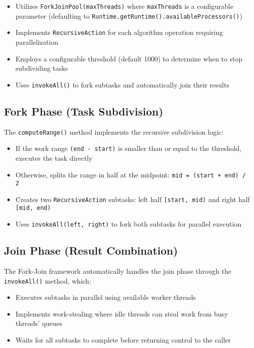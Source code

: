 \begin{itemize}
    \item Utilizes \texttt{ForkJoinPool(maxThreads)} where \texttt{maxThreads}
    is a configurable parameter (defaulting to
    \texttt{Runtime.getRuntime().availableProcessors()})
    \item Implements \texttt{RecursiveAction} for each algorithm operation
    requiring parallelization
    \item Employs a configurable threshold (default 1000) to determine when to
    stop subdividing tasks
    \item Uses \texttt{invokeAll()} to fork subtasks and automatically join
    their results
\end{itemize}

\subsection{Fork Phase (Task Subdivision)}
The \texttt{computeRange()} method implements the recursive subdivision logic:

\begin{itemize}
    \item If the work range \texttt{(end - start)} is smaller than or equal to
    the threshold, executes the task directly
    \item Otherwise, splits the range in half at the midpoint: \texttt{mid =
    (start + end) / 2}
    \item Creates two \texttt{RecursiveAction} subtasks: left half
    \texttt{[start, mid)} and right half \texttt{[mid, end)}
    \item Uses \texttt{invokeAll(left, right)} to fork both subtasks for
    parallel execution
\end{itemize}

\newpage

\subsection{Join Phase (Result Combination)}
The Fork-Join framework automatically handles the join phase through the
\texttt{invokeAll()} method, which:

\begin{itemize}
    \item Executes subtasks in parallel using available worker threads
    \item Implements work-stealing where idle threads can steal work from busy
    threads' queues
    \item Waits for all subtasks to complete before returning control to the
    caller
\end{itemize}

